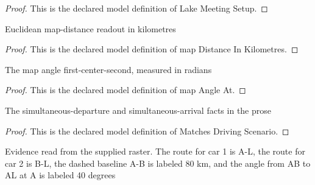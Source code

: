 \begin{proof}
  This is the declared model definition of Lake Meeting Setup.
\end{proof}
\begin{definition}
  \label{def:physics:phyx-mini-0690:phyxminiproblems-problemphyxmini0690-mapdistanceinkilometres}
  Euclidean map-distance readout in kilometres
\end{definition}
\begin{proof}
  This is the declared model definition of map Distance In Kilometres.
\end{proof}
\begin{definition}
  \label{def:physics:phyx-mini-0690:phyxminiproblems-problemphyxmini0690-mapangleat}
  The map angle first-center-second, measured in radians
\end{definition}
\begin{proof}
  This is the declared model definition of map Angle At.
\end{proof}
\begin{definition}
  \label{def:physics:phyx-mini-0690:phyxminiproblems-problemphyxmini0690-matchesdrivingscenario}
  The simultaneous-departure and simultaneous-arrival facts in the prose
\end{definition}
\begin{proof}
  This is the declared model definition of Matches Driving Scenario.
\end{proof}
\begin{definition}
  \label{def:physics:phyx-mini-0690:phyxminiproblems-problemphyxmini0690-matchessuppliedfigure}
  Evidence read from the supplied raster. The route for car 1 is A-L, the route for car 2 is B-L, the dashed baseline A-B is labeled 80 km, and the angle from AB to AL at A is labeled 40 degrees
\end{definition}
